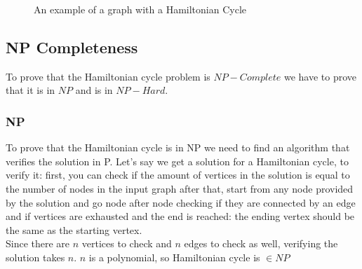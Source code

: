 \begin{itemize}
\begin{figure}


\caption{An example of a graph with a Hamiltonian Cycle}
\end{figure}

\subsection{NP Completeness}

To prove that the Hamiltonian cycle problem is $NP-Complete$ we have to prove that it is in $NP$ and is in $NP-Hard$.
\subsubsection{NP}
To prove that the Hamiltonian cycle is in NP we need to find an algorithm that verifies the solution in P. Let's say we get a solution for a Hamiltonian cycle, to verify it: first, you can check if the amount of vertices in the solution is equal to the number of nodes in the input graph after that, start from any node provided by the solution and go node after node checking if they are connected by an edge and if vertices are exhausted and the end is reached: the ending vertex should be the same as the starting vertex.\\

Since there are $n$ vertices to check and $n$ edges to check as well, verifying the solution takes $n$. $n$ is a polynomial, so Hamiltonian cycle is $\in NP$ 


\end{itemize}
